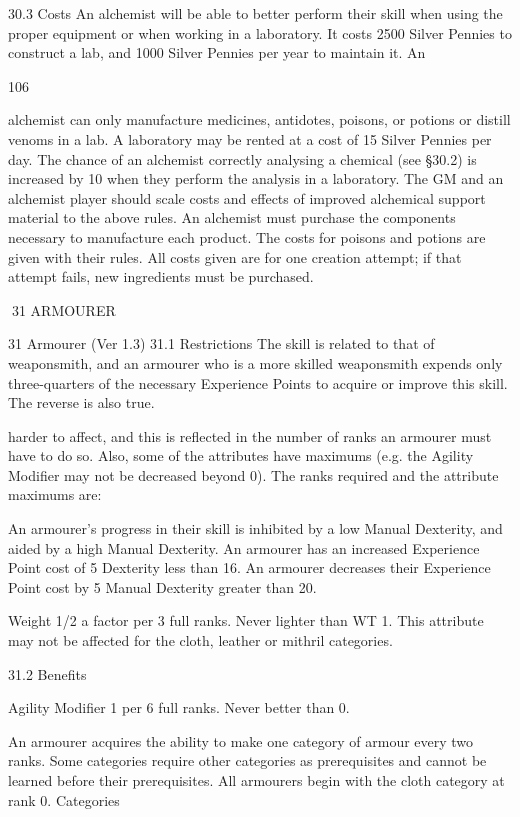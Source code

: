 \documentclass[a4paper]{article}
\begin{document}
\begin{multicols}{3}
30.3 Costs
An alchemist will be able to better perform their
skill when using the proper equipment or when
working in a laboratory.
It costs 2500 Silver Pennies to construct a lab, and
1000 Silver Pennies per year to maintain it. An

106

alchemist can only manufacture medicines, antidotes, poisons, or potions or distill venoms in a lab.
A laboratory may be rented at a cost of 15 Silver
Pennies per day.
The chance of an alchemist correctly analysing a
chemical (see §30.2) is increased by 10 when they
perform the analysis in a laboratory.
The GM and an alchemist player should scale costs
and effects of improved alchemical support material to the above rules.
An alchemist must purchase the components
necessary to manufacture each product.
The costs for poisons and potions are given with
their rules. All costs given are for one creation
attempt; if that attempt fails, new ingredients must
be purchased.

31 ARMOURER

31 Armourer (Ver 1.3)
31.1 Restrictions
The skill is related to that of weaponsmith, and an
armourer who is a more skilled weaponsmith expends only three-quarters of the necessary Experience Points to acquire or improve this skill. The
reverse is also true.

harder to affect, and this is reflected in the number
of ranks an armourer must have to do so. Also,
some of the attributes have maximums (e.g. the
Agility Modifier may not be decreased beyond 0).
The ranks required and the attribute maximums
are:

An armourer’s progress in their skill is inhibited by
a low Manual Dexterity, and aided by a high Manual Dexterity. An armourer has an increased Experience Point cost of 5%
Dexterity less than 16. An armourer decreases their
Experience Point cost by 5%
Manual Dexterity greater than 20.

Weight 1/2 a factor per 3 full ranks. Never lighter
than WT 1. This attribute may not be affected for
the cloth, leather or mithril categories.

31.2 Benefits

Agility Modifier 1 per 6 full ranks. Never better
than 0.

An armourer acquires the ability to make one
category of armour every two ranks.
Some categories require other categories as prerequisites and cannot be learned before their prerequisites. All armourers begin with the cloth category
at rank 0.
Categories


\end{multicols}
\end{document}
